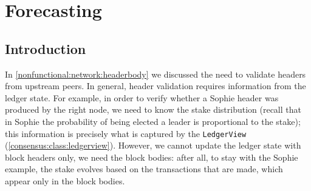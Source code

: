 \section{Forecasting}
\label{ledger:forecasting}

\subsection{Introduction}

In \cref{nonfunctional:network:headerbody} we discussed the need to validate
headers from upstream peers. In general, header validation requires information
from the ledger state. For example, in order to verify whether a Sophie header
was produced by the right node, we need to know the stake distribution (recall
that in Sophie the probability of being elected a leader is proportional to the
stake); this information is precisely what is captured by the
\lstinline!LedgerView! (\cref{consensus:class:ledgerview}). However, we cannot
update the ledger state with block headers only, we need the block bodies: after
all, to stay with the Sophie example, the stake evolves based on the
transactions that are made, which appear only in the block bodies.

